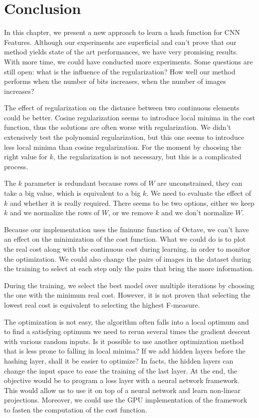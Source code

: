 \section{Conclusion}
In this chapter, we present a new approach to learn a hash function for CNN Features. Although our experiments are superficial and can't prove that our method yields state of the art performances, we have very promising results. With more time, we could have conducted more experiments. Some questions are still open: what is the influence of the regularization? How well our method performs when the number of bits increases, when the number of images increases?

The effect of regularization on the distance between two continuous elements could be better. Cosine regularization seems to introduce local minima in the cost function, thus the solutions are often worse with regularization. We didn't extensively test the polynomial regularization, but this one seems to introduce less local minima than cosine regularization. For the moment by choosing the right value for $k$, the regularization is not necessary, but this is a complicated process.

The $k$ parameter is redundant because rows of $W$ are unconstrained, they can take a big value, which is equivalent to a big $k$. We need to evaluate the effect of $k$ and whether it is really required. There seems to be two options, either we keep $k$ and we normalize the rows of $W$, or we remove $k$ and we don't normalize $W$. 

Because our implementation uses the fminunc function of Octave, we can't have an effect on the minimization of the cost function. What we could do is to plot the real cost along with the continuous cost during learning, in order to monitor the optimization. We could also change the pairs of images in the dataset during the training to select at each step only the pairs that bring the more information.

During the training, we select the best model over multiple iterations by choosing the one with the minimum real cost. However, it is not proven that selecting the lowest real cost is equivalent to selecting the highest F-measure. 

The optimization is not easy, the algorithm often falls into a local optimum and to find a satisfying optimum we need to rerun several times the gradient descent with various random inputs. Is it possible to use another optimization method that is less prone to falling in local minima? If we add hidden layers before the hashing layer, shall it be easier to optimize? In facts, the hidden layers can change the input space to ease the training of the last layer. At the end, the objective would be to program a loss layer with a neural network framework. This would allow us to use it on top of a neural network and learn non-linear projections. Moreover, we could use the GPU implementation of the framework to fasten the computation of the cost function.

